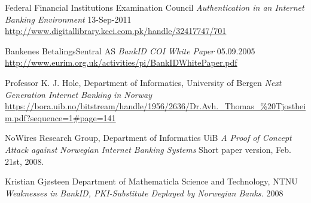 \documentclass[a4paper,11pt]{article}
\begin{document}
\begin{thebibliography}{N}\label{sec:references}

 Federal Financial Institutions Examination Council  \textit{Authentication in an Internet Banking Environment} 13-Sep-2011 \url{http://www.digitallibrary.kcci.com.pk/handle/32417747/701}

 Bankenes BetalingsSentral AS \textit{BankID COI White Paper} 05.09.2005 \url{http://www.eurim.org.uk/activities/pi/BankIDWhitePaper.pdf}

  Professor K. J. Hole, Department of Informatics, University of
Bergen \textit{Next Generation Internet Banking in Norway} \url{https://bora.uib.no/bitstream/handle/1956/2636/Dr.Avh._Thomas_%20Tjostheim.pdf?sequence=1#page=141}

NoWires Research Group, Department of Informatics UiB \textit{A Proof of Concept Attack against Norwegian Internet Banking Systems} Short paper version, Feb. 21st, 2008.

Kristian Gjøsteen Department of Mathematicla Science and Technology, NTNU \textit{Weaknesses in BankID, PKI-Substitute Deplayed by Norwegian Banks.} 2008



\end{thebibliography}
\end{document}
